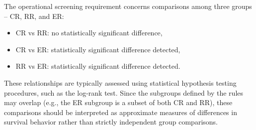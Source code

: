 
The operational screening requirement concerns comparisons among three groups -- CR, RR, and ER:

\begin{itemize}
\item CR vs RR: no statistically significant difference,
\item CR vs ER: statistically significant difference detected,
\item RR vs ER: statistically significant difference detected.
\end{itemize}

These relationships are typically assessed using statistical hypothesis testing procedures, such as the log-rank test. Since the subgroups defined by the rules may overlap (e.g., the ER subgroup is a subset of both CR and RR), these comparisons should be interpreted as approximate measures of differences in survival behavior rather than strictly independent group comparisons.




